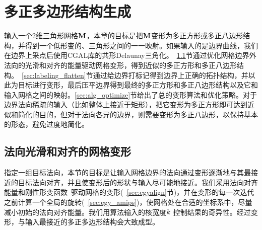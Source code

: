 \chapter{多正多边形结构生成} \label{chap:polyquad}
输入一个2维三角形网格$\mathbf{M}$，本章的目标是把$\mathbf{M}$变形为多正方形或多正八边形结构，并得到一个低形变的、三角形之间的一一映射。如果输入的是边界曲线，我们在边界上采点后使用CGAL库的共形Delaunay三角化。~\ref{sec:smooth_align}节通过优化网格边界外法向的光滑和对齐的能量驱动网格变形，得到近似的多正方形和多正八边形结构。~\ref{sec:labeling_flatten}节通过给边界打标记得到边界上正确的拓扑结构，并以此为目标进行变形，最后压平边界得到最终的多正方形和多正八边形结构以及它和输入网格之间的映射。\ref{sec:alg_optimize}节给出了总的变形算法和优化策略。对于边界法向稀疏的输入（比如整体上接近于矩形），把它变形为多正方形即可达到近似和简化的目的，但对于法向各异的边界，则需要变形为多正八边形，以保持基本的形态，避免过度地简化。

\section{法向光滑和对齐的网格变形} \label{sec:smooth_align}
指定一组目标法向，本节的目标是让输入网格边界的法向通过变形逐渐地与其最接近的目标法向对齐，并且使变形后的形状与输入尽可能地接近。我们采用法向对齐能量和刚性形变函数~\cite{Fu2015}驱动网格的变形(~\ref{sec:egyalign}节)，并在变形的每一次迭代之前计算一个全局的旋转(~\ref{sec:egy_amips})，使网格处在合适的坐标系中，尽量减小初始的法向对齐能量。我们用算法输入的核宽度$k$ 控制结果的奇异性。经过变形，与输入最接近的多正多边形结构会大致成型。

